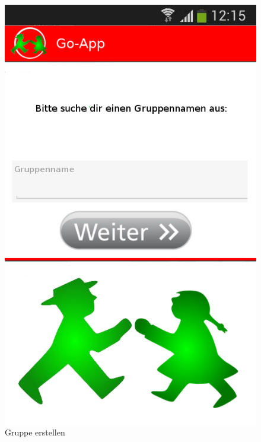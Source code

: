 \begin{figure}
	\caption{Gruppe erstellen}
	\includegraphics[scale =0.5]{resources/images/gruppe_erstellen.png}
\end{figure}

